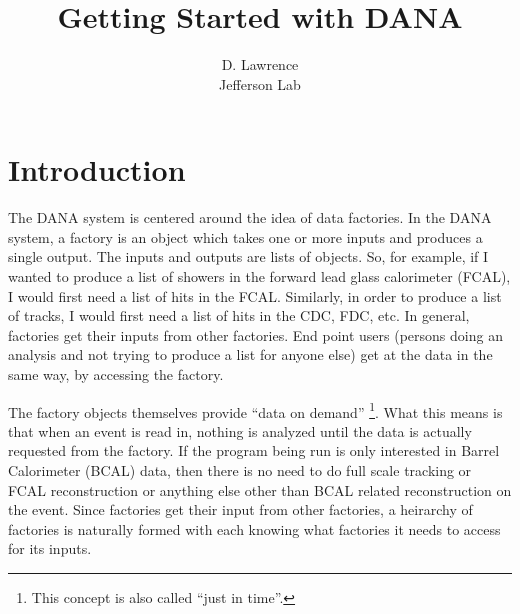 \documentclass[12pt]{article}
\author{D. Lawrence \\ Jefferson Lab}
\title{Getting Started with DANA}
\begin{document}
\maketitle



\newpage
\tableofcontents
\newpage

\section{Introduction}
The DANA system is centered around the idea of data factories. In the
DANA system, a factory is an object which takes one or more inputs
and produces a single output. The inputs and outputs are lists of objects.
So, for example, if I wanted to produce a list of showers in the forward
lead glass calorimeter (FCAL), I would first need a list of hits in the
FCAL. Similarly, in order to produce a list of tracks, I would first
need a list of hits in the CDC, FDC, etc. In general, factories get their
inputs from other factories. End point users (persons doing an analysis
and not trying to produce a list for anyone else) get at the data in the
same way, by accessing the factory.

The factory objects themselves provide ``data on demand''
\footnote{This concept is also called ``just in time''.}. What this
means is that when an event is read in, nothing is analyzed until the
data is actually requested from the factory. If the program being run
is only interested in Barrel Calorimeter (BCAL) data, then there is
no need to do full scale tracking or FCAL reconstruction or anything
else other than BCAL related reconstruction on the event.
Since factories get their input from other factories, a heirarchy
of factories is naturally formed with each knowing what factories it
needs to access for its inputs.
\end{document}
